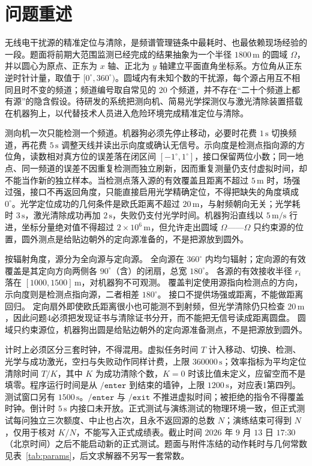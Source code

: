 \section{问题重述}

无线电干扰源的精准定位与清除，是频谱管理链条中最耗时、也最依赖现场经验的一段。题面将前期大范围监测已经完成的结果抽象为一个半径 $1800\,\mathrm{m}$ 的圆域 $\Omega$，并以圆心为原点、正东为 $x$ 轴、正北为 $y$ 轴建立平面直角坐标系。方位角从正东逆时针计量，取值于 $[0^\circ,360^\circ)$。圆域内有未知个数的干扰源，每个源占用互不相同且时不变的频道；频道编号取自常见的 $20$ 个频道，并不存在“二十个频道上都有源”的隐含假设。待研发的系统把测向机、简易光学探测仪与激光清除装置搭载在机器狗上，以代替技术人员进入危险环境完成精准定位与清除。

测向机一次只能检测一个频道。机器狗必须先停止移动，必要时花费 $1\,\mathrm{s}$ 切换频道，再花费 $5\,\mathrm{s}$ 调整天线并读出示向度或确认无信号。示向度是检测点指向源的方位角，读数相对真方位的误差落在闭区间 $[-1^\circ,1^\circ]$，接口保留两位小数；同一地点、同一频道的误差不因重复检测而独立刷新，因而重复测量仍支付虚拟时间，却不能当作新的独立样本。当检测点落入源的有效覆盖且距离不超过 $5\,\mathrm{m}$ 时，场强过强，接口不再返回角度，只能直接启用光学精确定位，不得把缺失的角度填成 $0^\circ$。光学定位成功的几何条件是欧氏距离不超过 $20\,\mathrm{m}$，与射频朝向无关；光学耗时 $3\,\mathrm{s}$，激光清除成功再加 $2\,\mathrm{s}$，失败仍支付光学时间。机器狗沿直线以 $5\,\mathrm{m/s}$ 行进，坐标分量绝对值不得超过 $2\times 10^6\,\mathrm{m}$，但允许走出圆域 $\Omega$——$\Omega$ 只约束源的位置，圆外测点是给贴边朝外的定向源准备的，不是把源放到圆外。

按辐射角度，源分为全向源与定向源。
全向源在 $360^\circ$ 内均匀辐射；定向源的有效覆盖是其定向方向两侧各 $90^\circ$（含）的闭扇，总宽 $180^\circ$。
各源的有效接收半径 $r_i$ 落在 $[1000,1500]\,\mathrm{m}$，对机器狗不可观测。
覆盖判定使用源指向检测点的方向，示向度则是检测点指向源，二者相差 $180^\circ$。
接口不提供场强或距离，不能做距离回归。
定向扇外即使欧氏距离很小也可能测不到射频，但光学清除仍只检查 $20\,\mathrm{m}$，因此问题4必须把发现证书与清除证书分开，而不能把无信号读成距离圆盘。
圆域只约束源位，机器狗出圆是给贴边朝外的定向源准备测点，不是把源放到圆外。

计时上必须区分三套时钟，不得混用。虚拟任务时间 $T$ 计入移动、切换、检测、光学与成功激光，空扫与失败动作同样计费，上限 $360000\,\mathrm{s}$；效率指标为平均定位清除时间 $T/K$，其中 $K$ 为成功清除个数，$K=0$ 时该比值未定义，应留空而不是填零。程序运行时间是从 $\mathtt{/enter}$ 到结束的墙钟，上限 $1200\,\mathrm{s}$，对应表1第四列。测试窗口另有 $1500\,\mathrm{s}$。$\mathtt{/enter}$ 与 $\mathtt{/exit}$ 不推进虚拟时间；被拒绝的指令不得覆盖时钟。倒计时 $5\,\mathrm{s}$ 内接口未开放。正式测试与演练测试的物理环境一致，但正式测试每问独立三次额度、中止也占次，且永不返回源的总数 $N$；演练结束可得到 $N$，仅用于核对 $K/N$，不能写入正式成绩表。截止时间 $2026$ 年 $9$ 月 $13$ 日 $17$:$30$（北京时间）之后不能启动新的正式测试。题面与附件冻结的动作耗时与几何常数见表~\ref{tab:params}，后文求解器不另写一套常数。

